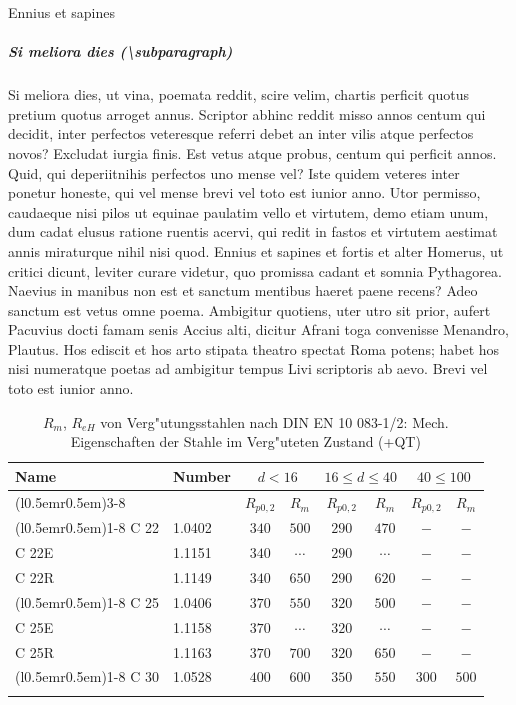 \documentclass[article,colorback,accentcolor=tud4c]{tudreport}
\begin{document}
    Ennius et sapines 
  \subparagraph{Si meliora dies (\textbackslash subparagraph)}
    Si meliora dies, ut vina, poemata reddit, scire velim, chartis perficit quotus pretium quotus arroget annus. Scriptor abhinc reddit misso annos centum qui decidit, inter perfectos veteresque referri debet an inter vilis atque perfectos novos? Excludat iurgia finis. Est vetus atque probus, centum qui perficit annos. Quid, qui deperiitnihis perfectos uno mense vel? Iste quidem veteres inter ponetur honeste, qui vel mense brevi vel toto est iunior anno. Utor permisso, caudaeque nisi pilos ut equinae paulatim vello et virtutem, demo etiam unum, dum cadat elusus ratione ruentis acervi, qui redit in fastos et virtutem aestimat annis miraturque nihil nisi quod. Ennius et sapines et fortis et alter Homerus, ut critici dicunt, leviter curare videtur, quo promissa cadant et somnia Pythagorea.  Naevius in manibus non est et sanctum mentibus haeret paene recens?  Adeo sanctum est vetus omne poema. Ambigitur quotiens, uter utro sit prior, aufert Pacuvius docti famam senis Accius alti, dicitur Afrani toga convenisse Menandro, Plautus. Hos ediscit et hos arto stipata theatro spectat Roma potens; habet hos nisi numeratque poetas ad ambigitur tempus Livi scriptoris ab aevo. Brevi vel toto est iunior anno.

    \begin{center}
      \begin{longtable}[h!]
        {ll@{\kern5em}c@{\kern1.1em}c@{\kern1.1em}
        c@{\kern1.1em}c@{\kern1.1em}c@{\kern1.1em}c}
        \toprule
        \multirow{2}{*}{Name}&\multirow{2}{*}{Number}
        &\multicolumn{2}{c}{$d < 16$}&\multicolumn{2}{c}{$16 \leq d \leq 40$}&
        \multicolumn{2}{c}{$40 \leq 100$}\\\cmidrule(l{0.5em}r{0.5em}){3-8}
        & &$R_{p0,2}$ &$R_m$ &$R_{p0,2}$ &$R_m$ &$R_{p0,2}$ &$R_m$\\
        \cmidrule(l{0.5em}r{0.5em}){1-8}
        \endhead
        C 22 &1.0402 &$340$ &$500$ &$290$ &$470$ &$-$ &$-$\\
        C 22E &1.1151 &$340$ &$\cdots$ &$290$ &$\cdots$ &$-$ &$-$\\
        C 22R &1.1149 &$340$ &$650$ &$290$ &$620$ &$-$ &$-$\\
        \cmidrule(l{0.5em}r{0.5em}){1-8}
        C 25 &1.0406 &$370$ &$550$ &$320$ &$500$ &$-$ &$-$\\
        C 25E &1.1158 &$370$ &$\cdots$ &$320$ &$\cdots$ &$-$ &$-$\\
        C 25R &1.1163 &$370$ &$700$ &$320$ &$650$ &$-$ &$-$\\
        \cmidrule(l{0.5em}r{0.5em}){1-8}
        C 30 &1.0528 &$400$ &$600$ &$350$ &$550$ &$300$ &$500$\\
        \bottomrule
        \caption{$R_m$, $R_{eH}$ von Verg"utungsstahlen nach DIN EN 10 083-1/2: Mech.
          Eigenschaften der Stahle im Verg"uteten Zustand (+QT)}
      \end{longtable}
    \end{center}
\end{document}
